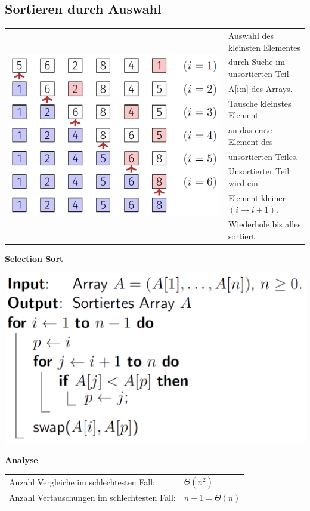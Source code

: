 \begin{sectionbox}
\subsection{Sortieren durch Auswahl}\smallskip
\begin{tabular*}{\columnwidth}{@{\extracolsep\fill}ll@{}}
\multirow{9}{*}{\includegraphics[width = 0.5\columnwidth]{../img/selectSort.png}}
& Auswahl des kleinsten Elementes \\
& durch Suche im unsortierten Teil \\
& A[i:n] des Arrays.\smallskip \\
& Tausche kleinstes Element \\
& an das erste Element des \\
& unsortierten Teiles.\smallskip\\
& Unsortierter Teil wird ein\\
& Element kleiner $(i \rightarrow i+1)$.\\
& Wiederhole bis alles sortiert.\\
\end{tabular*}\smallskip

\textbf{Selection Sort}\par
\includegraphics[width = 0.7\columnwidth]{../img/selectSortCode.png}\par\smallskip

\textbf{Analyse}\par
\begin{tabular*}{\columnwidth}{@{\extracolsep\fill}ll@{}}
Anzahl Vergleiche im schlechtesten Fall: & $\Theta(n^{2})$ \\
Anzahl Vertauschungen im schlechtesten Fall: & $n-1=\Theta(n)$\\
\end{tabular*}
\end{sectionbox}

